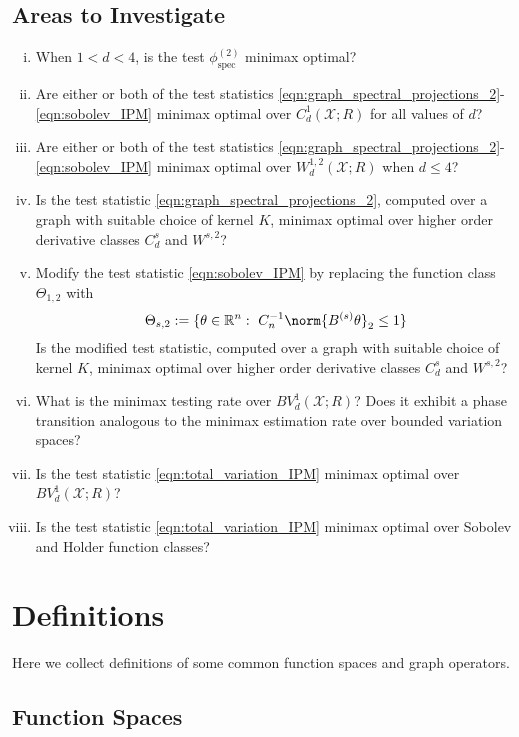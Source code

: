 \documentclass{article}
\newcommand{\Reals}{\mathbb{R}}
\newcommand{\1}{\mathbf{1}}
\newcommand{\spec}{\mathrm{spec}}
\theoremstyle{alden}
\theoremstyle{aldenthm}
\theoremstyle{definition}
\theoremstyle{remark}
\begin{document}
\subsection{Areas to Investigate}

\begin{enumerate}[(i)]
	\item When $1 < d < 4$, is the test $\phi_{\spec}^{(2)}$ minimax optimal?
	\item Are either or both of the test statistics \eqref{eqn:graph_spectral_projections_2}-\eqref{eqn:sobolev_IPM} minimax optimal over $C_d^1(\mathcal{X};R)$ for all values of $d$?
	\item Are either or both of the test statistics \eqref{eqn:graph_spectral_projections_2}-\eqref{eqn:sobolev_IPM} minimax optimal over $W_d^{1,2}(\mathcal{X};R)$ when $d \leq 4$?
	\item Is the test statistic \eqref{eqn:graph_spectral_projections_2}, computed over a graph with suitable choice of kernel $K$, minimax optimal over higher order derivative classes $C_d^s$ and $W^{s,2}$? 
	\item Modify the test statistic \eqref{eqn:sobolev_IPM} by replacing the function class $\Theta_{1,2}$ with
	\begin{equation}
	\Theta_{s,2} := \{\theta \in \Reals^n:~ C_n^{-1} \norm{B^{(s)}\theta}_2 \leq 1\} 
	\end{equation}
	Is the modified test statistic, computed over a graph with suitable choice of kernel $K$, minimax optimal over higher order derivative classes $C_d^s$ and $W^{s,2}$?
	\item What is the minimax testing rate over $BV_d^{1}(\mathcal{X};R)$? Does it exhibit a phase transition analogous to the minimax estimation rate over bounded variation spaces?
	\item Is the test statistic \eqref{eqn:total_variation_IPM} minimax optimal over $BV_d^{1}(\mathcal{X};R)$?
	\item Is the test statistic \eqref{eqn:total_variation_IPM} minimax optimal over Sobolev and Holder function classes?
\end{enumerate}

\section{Definitions}

Here we collect definitions of some common function spaces and graph operators.

\subsection{Function Spaces}
\end{document}
